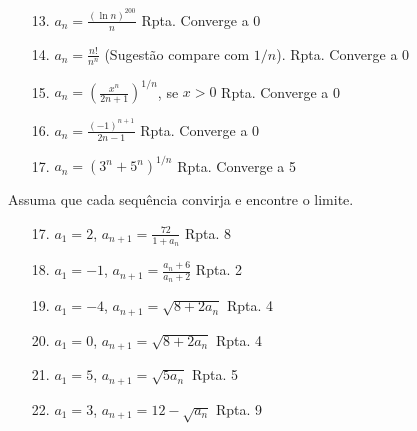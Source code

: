 \begin{itemize}
	\item [13.]$a_{n}=\frac{(\ln n)^{200}}{n}$ \quad\quad Rpta. Converge a 0
\end{itemize}
\begin{itemize}
	\item [14.] $a_{n}=\frac{n!}{n^{n}}$ (Sugestão compare com $1/n$). \quad\quad Rpta. Converge a 0
\end{itemize}
\begin{itemize}
	\item [15.] $a_{n}=(\frac{x^{n}}{2n+1})^{1/n}$, se $x>0$ \quad\quad Rpta. Converge a 0
\end{itemize}
\begin{itemize}
	\item [16.] $a_{n}=\frac{(-1)^{n+1}}{2n-1}$ \quad\quad  Rpta. Converge a 0
\end{itemize}
\begin{itemize}
	\item [17.] $a_{n}=(3^{n}+5^{n})^{1/n}$  \quad\quad  Rpta. Converge a 5
\end{itemize}
Assuma que cada sequência convirja e encontre o limite.
\begin{itemize}
	\item [17.] $a_{1}=2$, $a_{n+1}= \frac{72}{1+a_{n}}$ \quad\quad  Rpta. 8
\end{itemize}
\begin{itemize}
	\item [18.] $a_{1}=-1$, $a_{n+1}= \frac{a_{n}+6}{a_{n}+2}$ \quad\quad  Rpta. 2
\end{itemize}	
\begin{itemize}
	\item [19.] $a_{1}=-4$, $a_{n+1}= \sqrt{8+2a_{n}}$ \quad\quad  Rpta. 4
\end{itemize}
\begin{itemize}
	\item [20.] $a_{1}=0$, $a_{n+1}= \sqrt{8+2a_{n}}$ \quad\quad  Rpta. 4
\end{itemize}
\begin{itemize}
	\item [21.] $a_{1}=5$, $a_{n+1}= \sqrt{5a_{n}}$ \quad\quad  Rpta. 5
\end{itemize}
\begin{itemize}
	\item [22.] $a_{1}=3$, $a_{n+1}= 12-\sqrt{a_{n}}$ \quad\quad  Rpta. 9
\end{itemize}
